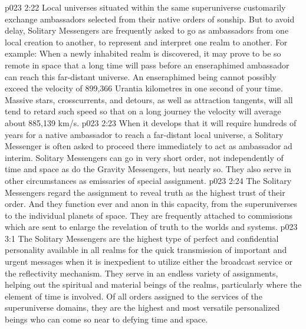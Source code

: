 \vs p023 2:22 \bibnobreakspace {} Local universes situated within the same superuniverse customarily exchange ambassadors selected from their native orders of sonship. But to avoid delay, Solitary Messengers are frequently asked to go as ambassadors from one local creation to another, to represent and interpret one realm to another. For example: When a newly inhabited realm is discovered, it may prove to be so remote in space that a long time will pass before an enseraphimed ambassador can reach this far\hyp{}distant universe. An enseraphimed being cannot possibly exceed the velocity of 899,366 Urantia kilometres in one second of your time. Massive stars, crosscurrents, and detours, as well as attraction tangents, will all tend to retard such speed so that on a long journey the velocity will average about 885,139 km/s.
\vs p023 2:23 When it develops that it will require hundreds of years for a native ambassador to reach a far\hyp{}distant local universe, a Solitary Messenger is often asked to proceed there immediately to act as ambassador ad interim. Solitary Messengers can go in very short order, not independently of time and space as do the Gravity Messengers, but nearly so. They also serve in other circumstances as emissaries of special assignment.
\vs p023 2:24 \bibnobreakspace {} The Solitary Messengers regard the assignment to reveal truth as the highest trust of their order. And they function ever and anon in this capacity, from the superuniverses to the individual planets of space. They are frequently attached to commissions which are sent to enlarge the revelation of truth to the worlds and systems.
\vs p023 3:1 The Solitary Messengers are the highest type of perfect and confidential personality available in all realms for the quick transmission of important and urgent messages when it is inexpedient to utilize either the broadcast service or the reflectivity mechanism. They serve in an endless variety of assignments, helping out the spiritual and material beings of the realms, particularly where the element of time is involved. Of all orders assigned to the services of the superuniverse domains, they are the highest and most versatile personalized beings who can come so near to defying time and space.
